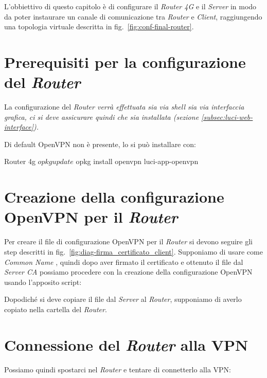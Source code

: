 L'obbiettivo di questo capitolo è di configurare il \textit{Router 4G} e il \textit{Server} in modo da poter instaurare un canale di comunicazione tra \textit{Router} e \textit{Client}, raggiungendo una topologia virtuale descritta in fig.~\ref{fig:conf-final-router}.

\section{Prerequisiti per la configurazione del \textit{Router} }

La configurazione del \it{Router} verrà effettuata sia via shell sia via interfaccia grafica, ci si deve assicurare quindi che sia installata (sezione \ref{subsec:luci-web-interface}).

Di default OpenVPN non è presente, lo si può installare con:

\begin{bashcode}{Router 4g}{}
$ opkg update
$ opkg install openvpn luci-app-openvpn
\end{bashcode}

\section{Creazione della configurazione OpenVPN per il \textit{Router} \ok}

Per creare il file di configurazione OpenVPN per il \textit{Router} si devono seguire gli step descritti in fig.~\ref{fig:diag-firma_certificato_client}. Supponiamo di usare come \textit{Common Name} , quindi dopo aver firmato il certificato e ottenuto il file  dal \textit{Server CA} possiamo procedere con la creazione della configurazione OpenVPN usando l'apposito script:


Dopodiché si deve copiare il file  dal \textit{Server} al \textit{Router}, supponiamo di averlo copiato nella cartella  del \textit{Router}. 


\section{Connessione del \textit{Router} alla VPN \ok}

Possiamo quindi spostarci nel \textit{Router} e tentare di connetterlo alla VPN:

